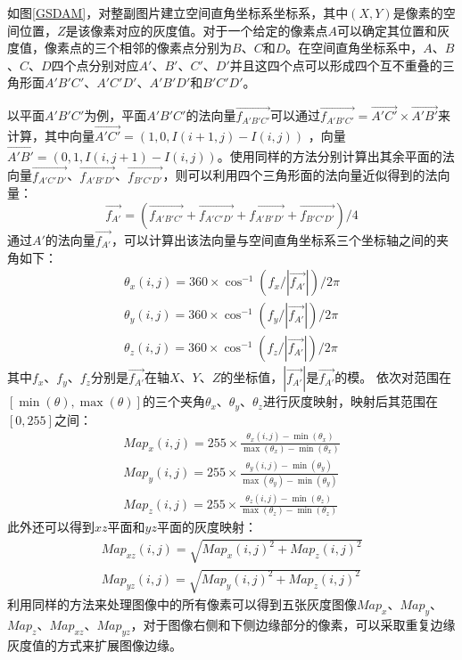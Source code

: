 如图\ref{GSDAM}，对整副图片建立空间直角坐标系坐标系，其中$(X,Y)$是像素的空间位置，$Z$是该像素对应的灰度值。对于一个给定的像素点$A$可以确定其位置和灰度值，像素点的三个相邻的像素点分别为$B$、$C$和$D$。在空间直角坐标系中，$A$、$B$、$C$、$D$四个点分别对应$A'$、$B'$、$C'$、$D'$并且这四个点可以形成四个互不重叠的三角形面$A'B'C'$、$A'C'D'$、$A'B'D'$和$B'C'D'$。

以平面$A'B'C'$为例，平面$A'B'C'$的法向量$\overrightarrow{f_{A'B'C'}}$可以通过$\overrightarrow{f_{A'B'C'}}=\overrightarrow{A'C'}\times\overrightarrow{A'B'}$来计算，其中向量$\overrightarrow{A'C'}=(1,0,I(i+1,j)-I(i,j))$ ，向量$\overrightarrow{A'B'}=(0,1,I(i,j+1)-I(i,j))$。使用同样的方法分别计算出其余平面的法向量$\overrightarrow{f_{A'C'D'}}$、$\overrightarrow{f_{A'B'D'}}$、$\overrightarrow{f_{B'C'D'}}$，则可以利用四个三角形面的法向量近似得到的法向量：
\begin{equation}
\overrightarrow{f_{A'}}=(\overrightarrow{f_{A'B'C'}}+\overrightarrow{f_{A'C'D'}}+\overrightarrow{f_{A'B'D'}}+\overrightarrow{f_{B'C'D'}})/4
\end{equation}
通过$A'$的法向量$\overrightarrow{f_{A'}}$，可以计算出该法向量与空间直角坐标系三个坐标轴之间的夹角如下：
\begin{equation}
\begin{split}
\theta_{x}(i,j)=360\times \cos ^{-1}(f_{x}/|\overrightarrow {f_{A'}}| )/2\pi\\
\theta_{y}(i,j)=360\times \cos ^{-1}(f_{y}/|\overrightarrow {f_{A'}}| )/2\pi\\
\theta_{z}(i,j)=360\times \cos ^{-1}(f_{z}/|\overrightarrow {f_{A'}}| )/2\pi
\end{split}
\end{equation}
其中$f_{x}$、$f_{y}$、$f_{z}$分别是$\overrightarrow{f_{A'}}$在轴$X$、$Y$、$Z$的坐标值，$|\overrightarrow {f_{A'}}|$是$\overrightarrow{f_{A'}}$的模。
依次对范围在$[\min(\theta),\max(\theta)]$的三个夹角$\theta_{x}$、$\theta_{y}$、$\theta_{z}$进行灰度映射，映射后其范围在$[0,255]$之间：
\begin{equation}
\begin{split}
Map_{x}(i,j)=255\times\frac{\theta_{x}(i,j)-\min(\theta_{x})}{\max(\theta_{x})-\min(\theta_{x})}\\
Map_{y}(i,j)=255\times\frac{\theta_{y}(i,j)-\min(\theta_{y})}{\max(\theta_{y})-\min(\theta_{y})}\\
Map_{z}(i,j)=255\times\frac{\theta_{z}(i,j)-\min(\theta_{z})}{\max(\theta_{z})-\min(\theta_{z})}
\end{split}
\end{equation}
此外还可以得到$xz$平面和$yz$平面的灰度映射：
\begin{equation}
\begin{split}
Map_{xz}(i,j)=\sqrt{Map_{x}(i,j)^{2}+Map_{z}(i,j)^{2}}\\
Map_{yz}(i,j)=\sqrt{Map_{y}(i,j)^{2}+Map_{z}(i,j)^{2}}
\end{split}
\end{equation}
利用同样的方法来处理图像中的所有像素可以得到五张灰度图像$Map_{x}$、$Map_{y}$、$Map_{z}$、$Map_{xz}$、$Map_{yz}$，对于图像右侧和下侧边缘部分的像素，可以采取重复边缘灰度值的方式来扩展图像边缘。
